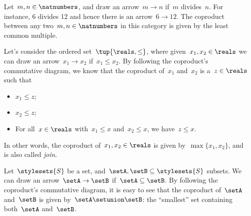 \begin{example}
	Let~$m,n\in \natnumbers$, and draw an arrow~$m\to n$ if~$m$ divides~$n$.
	For instance, 6 divides 12 and hence there is an arrow~$6\to 12$.
	The coproduct between any two~$m,n\in \natnumbers$ in this category is given by the least common multiple.
\end{example}

\begin{example}
	Let's consider the ordered set~$\tup{\reals,\leq}$, where given~$x_1,x_2\in \reals$ we can draw an arrow~$x_1\to x_2$ if~$x_1\leq x_2$.
	By following the coproduct's commutative diagram, we know that the coproduct of~$x_1$ and~$x_2$ is a~$z\in \reals$ such that
	\begin{itemize}
		\item $x_1\leq z$;
		\item $x_2\leq z$;
		\item For all~$x\in \reals$ with~$x_1\leq x$ and~$x_2\leq x$, we have~$z\leq x$.
	\end{itemize}
	In other words, the coproduct of~$x_1,x_2\in \reals$ is given by~$\max\{x_1,x_2\}$, and is also called \emph{join}.
\end{example}

\begin{example}
	\label{ex:subset_coprod}
	Let~$\stylesets{S}$ be a set, and~$\setA,\setB\subseteq \stylesets{S}$ subsets.
	We can draw an arrow~$\setA\to \setB$ if~$\setA\subseteq \setB$.
	By following the coproduct's commutative diagram, it is easy to see that the coproduct of~$\setA$ and~$\setB$ is given by~$\setA\setunion\setB$: the ``smallest'' set containing both~$\setA$ and~$\setB$.
\end{example}

